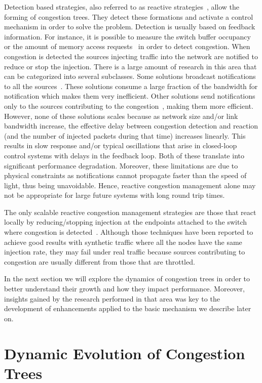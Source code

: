 \documentclass[12pt]{article}
\begin{document}
Detection based strategies, also referred to as reactive strategies~\cite{paper2}, allow the forming of congestion trees. They detect these formations and activate a control mechanism in order to solve the problem.  Detection is usually based on feedback information. For instance, it is possible to measure the switch buffer occupancy~\cite{LSC95,V00} or the amount of memory access requests~\cite{SS90} in order to detect congestion. When congestion is detected the sources injecting traffic into the network are notified to reduce or stop the injection. There is a large amount of research in this area that can be categorized into several subclasses. Some solutions broadcast notifications to all the sources~\cite{TLM01, V00}. These solutions consume a large fraction of the bandwidth for notification which makes them very inefficient. Other solutions send notifications only to the sources contributing to the congestion~\cite{KLC97}, making them more efficient. However, none of these solutions scales because as network size and/or link bandwidth increase, the effective delay between congestion detection and reaction (and the number of injected packets during that time) increases linearly. This results in slow response and/or typical oscillations that arise in closed-loop control systems with delays in the feedback loop. Both of these translate into significant performance degradation. Moreover, these limitations are due to physical constraints as notifications cannot propagate faster than the speed of light, thus being unavoidable. Hence, reactive congestion management alone may not be appropriate for large future systems with long round trip times.

The only scalable reactive congestion management strategies are those that react locally by reducing/stopping injection at the endpoints attached to the switch where congestion is detected~\cite{BLD01, LD93}. Although those techniques have been reported to achieve good results with synthetic traffic where all the nodes have the same injection rate, they may fail under real traffic because sources contributing to congestion are usually different from those that are throttled.

In the next section we will explore the dynamics of congestion trees in order to better understand their growth and how they impact performance. Moreover, insights gained by the research performed in that area was key to the development of enhancements applied to the basic mechanism we describe later on.

\section{Dynamic Evolution of Congestion Trees}\label{S:evolution}
\end{document}
